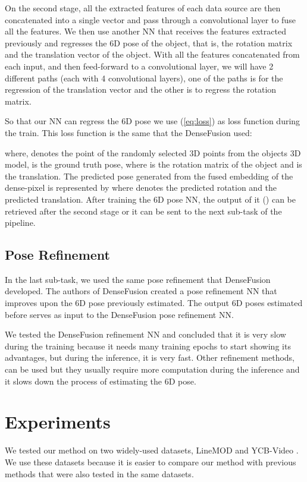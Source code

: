 \documentclass[runningheads]{llncs}
\begin{document}
On the second stage, all the extracted features of each data source are then concatenated into a single vector and pass through a convolutional layer to fuse all the features.
We then use another NN that receives the features extracted previously and regresses the 6D pose of the object, that is, the rotation matrix and the translation vector of the object.
With all the features concatenated from each input, and then feed-forward to a convolutional layer, we will have 2 different paths (each with 4 convolutional layers), one of the paths is for the regression of the translation vector and the other is to regress the rotation matrix.

So that our NN can regress the 6D pose we use (\ref{eq:loss}) as loss function during the train.
This loss function is the same that the DenseFusion used:
\vspace{-.2em}


where,  denotes the  point of the  randomly selected 3D points from the objects 3D model,  is the ground truth pose, where  is the rotation matrix of the object and  is the translation.
The predicted pose generated from the fused embedding of the  dense-pixel is represented by  where  denotes the predicted rotation and  the predicted translation.
After training the 6D pose NN, the output of it () can be retrieved after the second stage or it can be sent to the next sub-task of the pipeline.

\subsection{Pose Refinement}
In the last sub-task, we used the same pose refinement that DenseFusion developed.
The authors of DenseFusion created a pose refinement NN that improves upon the 6D pose previously estimated.
The output 6D poses estimated before serves as input to the DenseFusion pose refinement NN.

We tested the DenseFusion refinement NN and concluded that it is very slow during the training because it needs many training epochs to start showing its advantages, but during the inference, it is very fast.
Other refinement methods, can be used but they usually require more computation during the inference and it slows down the process of estimating the 6D pose.

\section{Experiments}
We tested our method on two widely-used datasets, LineMOD \cite{linemod} and YCB-Video \cite{posecnn}.
We use these datasets because it is easier to compare our method with previous methods that were also tested in the same datasets.
\end{document}
